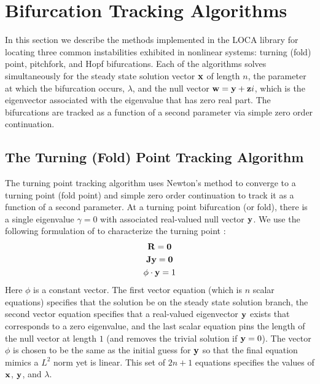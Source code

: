 \section{Bifurcation Tracking Algorithms}
\label{sec:bt}
In this section we describe the methods implemented in the LOCA library for locating three common instabilities exhibited in nonlinear systems: turning (fold) point, pitchfork, and Hopf bifurcations. Each of the algorithms solves simultaneously for the steady state solution vector ${\bf x}$ of length $n$, the parameter at which the bifurcation occurs, $\lambda$, and the null vector ${\bf w} = {\bf y} + {\bf z} i$, which is the eigenvector associated with the eigenvalue that has zero real part. The bifurcations are tracked as a function of a second parameter via simple zero order continuation.

\subsection{The Turning (Fold) Point Tracking Algorithm}
\label{sec:tp}

The turning point tracking algorithm uses Newton's method to converge to a turning point (fold point) and simple zero order continuation to track it as a function of a second parameter. At a turning point bifurcation (or fold), there is a single eigenvalue $\gamma=0$ with associated real-valued null vector ${\bf y}$. 
We use the following formulation of to characterize the turning point \cite{moore80}: 
\begin{gather}
\label{eq:tp}
{\bf R}={\bf 0} \\
{\bf J} {\bf y} = {\bf 0} \\
\phi \cdot {\bf y} = 1 \label{eq:tpnorm}
\end{gather}
Here $\phi$ is a constant vector.  The first vector equation (which is $n$ scalar equations) specifies that the solution be on the steady state solution branch, the second vector equation specifies that a real-valued eigenvector ${\bf y}$ exists that corresponds to a zero eigenvalue, and the last scalar equation pins the length of the null vector at length $1$ (and removes the trivial solution if ${\bf y}=0$). The vector $\phi$ is chosen to be the same as the initial guess for ${\bf y}$ so that the final equation mimics a $L^2$ norm yet is linear. This set of $2n+1$ equations specifies the values of ${\bf x}$, ${\bf y}$, and $\lambda$.

